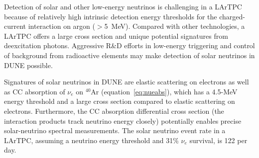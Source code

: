 Detection of solar and other low-energy neutrinos is challenging in
a LArTPC because of relatively high intrinsic detection energy thresholds for
the charged-current interaction on argon ($>$\SI{5}{\MeV}). 
Compared with other technologies, a LArTPC offers a large
cross section and unique potential signatures from deexcitation
photons. Aggressive R\&D efforts in low-energy triggering and
control of background from radioactive elements may make detection
of solar neutrinos in DUNE possible.

Signatures of solar neutrinos in DUNE
are elastic scattering on electrons as well as CC absorption of $\nu_e$ on $^{40}$Ar (equation~\ref{eq:nueabs}), which has a 4.5-MeV energy threshold and a large cross section compared to elastic scattering on electrons.  Furthermore, the CC absorption differential cross section (the interaction products track neutrino energy closely) potentially enables precise solar-neutrino spectral measurements.
The solar neutrino event rate in a
 LArTPC, assuming a  neutrino energy
threshold and 31\% $\nu_e$ survival, is 122 per day.
%


